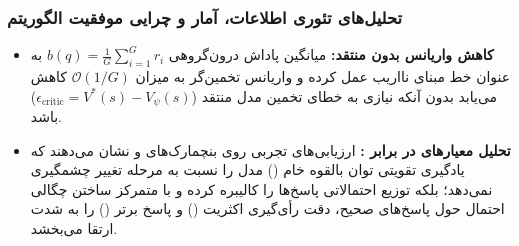 \begin{table}[htbp]
\centering
\caption{تحلیل ساختار روش‌های هم‌ترازسازی در چارچوب یکپارچه گرادیان \cite{shao2024deepseekmath}.}
\label{tab:unified_paradigm}
\end{table}

\subsubsection*{تحلیل‌های تئوری اطلاعات، آمار و چرایی موفقیت الگوریتم}

\begin{itemize}
    \item \textbf{کاهش واریانس بدون منتقد:} میانگین پاداش درون‌گروهی $b(q) = \frac{1}{G} \sum_{i=1}^G r_i$ به عنوان خط مبنای نااریب عمل کرده و واریانس تخمین‌گر به میزان $\mathcal{O}(1/G)$ کاهش می‌یابد بدون آنکه نیازی به خطای تخمین مدل منتقد ($\epsilon_{\text{critic}} = V^*(s) - V_\psi(s)$) باشد.
    \item \textbf{تحلیل معیارهای  در برابر :} ارزیابی‌های تجربی روی بنچمارک‌های  و  نشان می‌دهند که یادگیری تقویتی توان بالقوه خام () مدل را نسبت به مرحله  تغییر چشمگیری نمی‌دهد؛ بلکه توزیع احتمالاتی پاسخ‌ها را کالیبره کرده و با متمرکز ساختن چگالی احتمال حول پاسخ‌های صحیح، دقت رأی‌گیری اکثریت () و پاسخ برتر () را به شدت ارتقا می‌بخشد.
\end{itemize}

